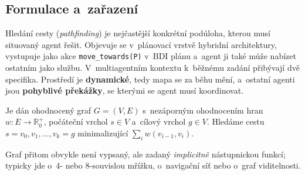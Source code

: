 \documentclass[11pt,a4paper]{article}
\theoremstyle{definition}
\begin{document}
\subsection{Formulace a~zařazení}

Hledání cesty (\emph{pathfinding}) je nejčastější konkrétní podúloha, kterou musí situovaný
agent řešit. Objevuje se v~plánovací vrstvě hybridní architektury, vystupuje jako akce
\texttt{move\_towards(P)} v~BDI plánu a~agent ji také může nabízet ostatním jako službu.
V~multiagentním kontextu k~běžnému zadání přibývají dvě specifika. Prostředí je
\textbf{dynamické}, tedy mapa se za běhu mění, a~ostatní agenti jsou \textbf{pohyblivé
překážky}, se kterými se agent musí koordinovat.

\begin{defbox}
Je dán ohodnocený graf $G = (V,E)$ s~nezáporným ohodnocením hran $w : E \to \mathbb{R}_0^+$,
počáteční vrchol $s \in V$ a~cílový vrchol $g \in V$. Hledáme cestu $s = v_0, v_1, \dots, v_k = g$
minimalizující $\sum_{i} w(v_{i-1},v_i)$.

Graf přitom obvykle není vypsaný, ale zadaný \emph{implicitně} nástupnickou funkcí; typicky jde
o~4- nebo 8-souvislou mřížku, o~navigační síť nebo o~graf viditelnosti.
\end{defbox}
\end{document}
